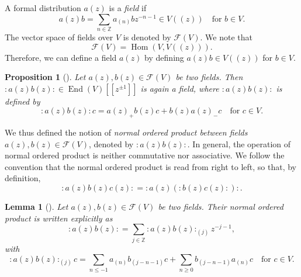 \documentclass[a4paper, 12pt, reqno]{amsart}
\newtheorem{lemma}[theorem]{Lemma}
\newtheorem{proposition}[theorem]{Proposition}
\theoremstyle{remark}
\DeclareMathOperator{\Hom}{Hom}
\DeclareMathOperator{\End}{End}
\begin{document}
A formal distribution $a(z)$ is a \emph{field} if
\begin{equation*}
  a(z)b = \sum_{n \in \mathbb{Z}}a_{(n)}bz^{-n - 1} \in V((z)) \quad \text{for $b \in V$}.
\end{equation*}
The vector space of fields over $V$ is denoted by $\mathcal{F}(V)$.
We note that
\begin{equation*}
  \mathcal{F}(V) = \Hom(V, V((z))).
\end{equation*}
Therefore, we can define a field $a(z)$ by defining $a(z)b \in V((z))$ for $b \in V$.

\begin{proposition}[{\cite[Proposition 3.3.2]{nozaradan_introduction_2008}}]
  \label{prp:2}
  Let $a(z), b(z) \in \mathcal{F}(V)$ be two fields.
  Then $:a(z)b(z): \in \End(V)[[z^{\pm1}]]$ is again a field, where $:a(z)b(z):$ is defined by
  \begin{equation*}
    :a(z)b(z):c = a(z)_+b(z)c + b(z)a(z)_-c \quad \text{for $c \in V$}.
  \end{equation*}
\end{proposition}

We thus defined the notion of \emph{normal ordered product between fields $a(z), b(z) \in \mathcal{F}(V)$}, denoted by $:a(z)b(z):$.
In general, the operation of normal ordered product is neither commutative nor associative.
We follow the convention that the normal ordered product is read from right to left, so that, by definition,
\begin{equation*}
  :a(z)b(z)c(z): = :a(z)(:b(z)c(z):):.
\end{equation*}

\begin{lemma}[{\cite[Proposition 3.3.3]{nozaradan_introduction_2008}}]
  \label{lmm:1}
  Let $a(z), b(z) \in \mathcal{F}(V)$ be two fields.
  Their normal ordered product is written explicitly as
  \begin{equation*}
    :a(z)b(z): = \sum_{j \in \mathbb{Z}}:a(z)b(z):_{(j)}z^{-j - 1},
  \end{equation*}
  with
  \begin{equation*}
    :a(z)b(z):_{(j)}c = \sum_{n \le -1}a_{(n)}b_{(j - n - 1)}c + \sum_{n \ge 0}b_{(j - n - 1)}a_{(n)}c \quad \text{for $c \in V$}.
  \end{equation*}
\end{lemma}
\end{document}

